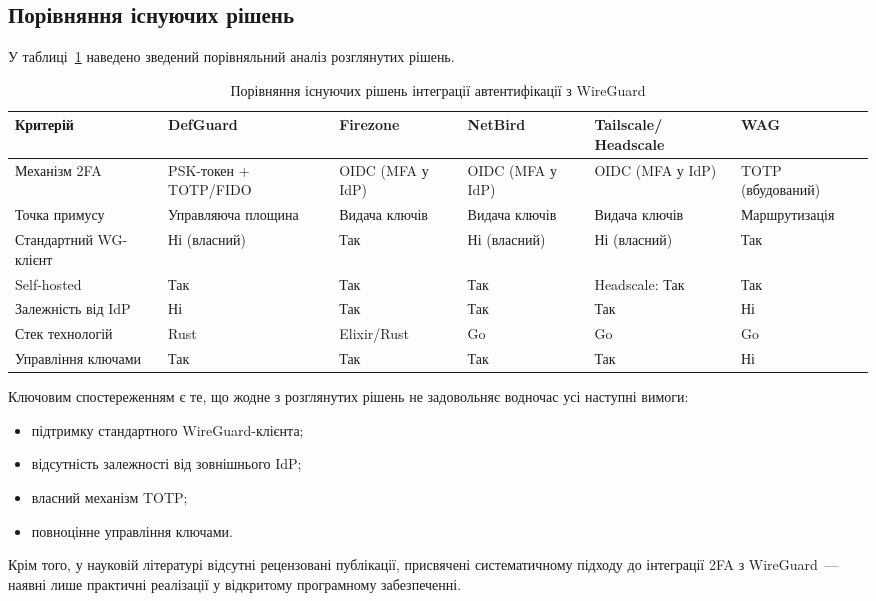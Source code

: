 \subsection{Порівняння існуючих рішень}

У таблиці~\ref{tab:solutions_comparison} наведено зведений порівняльний аналіз
розглянутих рішень.

\begin{table}[htbp]
\caption{Порівняння існуючих рішень інтеграції автентифікації з WireGuard}
\label{tab:solutions_comparison}
\small
\begin{tabularx}{\textwidth}{|p{2cm}|X|X|X|X|X|}
\hline
\textbf{Критерій} & \textbf{DefGuard} & \textbf{Firezone} & \textbf{NetBird} & \textbf{Tailscale/ Headscale} & \textbf{WAG} \\
\hline
Механізм 2FA & PSK-токен + TOTP/FIDO & OIDC (MFA у IdP) & OIDC (MFA у IdP) & OIDC (MFA у IdP) & TOTP (вбудований) \\
\hline
Точка примусу & Управляюча площина & Видача ключів & Видача ключів & Видача ключів & Мар\-шру\-ти\-зація \\
\hline
Стандартний WG-клієнт & Ні (власний) & Так & Ні (власний) & Ні (власний) & Так \\
\hline
Self-hosted & Так & Так & Так & Headscale: Так & Так \\
\hline
Залежність від IdP & Ні & Так & Так & Так & Ні \\
\hline
Стек технологій & Rust & Elixir/Rust & Go & Go & Go \\
\hline
Управління ключами & Так & Так & Так & Так & Ні \\
\hline
\end{tabularx}
\end{table}

Ключовим спостереженням є те, що жодне з розглянутих рішень не задовольняє
водночас усі наступні вимоги:
\begin{itemize}
  \item підтримку стандартного WireGuard-клієнта;
  \item відсутність залежності від зовнішнього IdP;
  \item власний механізм TOTP;
  \item повноцінне управління ключами.
\end{itemize}
Крім того, у науковій літературі
відсутні рецензовані публікації, присвячені систематичному підходу до
інтеграції 2FA з WireGuard~--- наявні лише практичні реалізації у відкритому
програмному забезпеченні.

